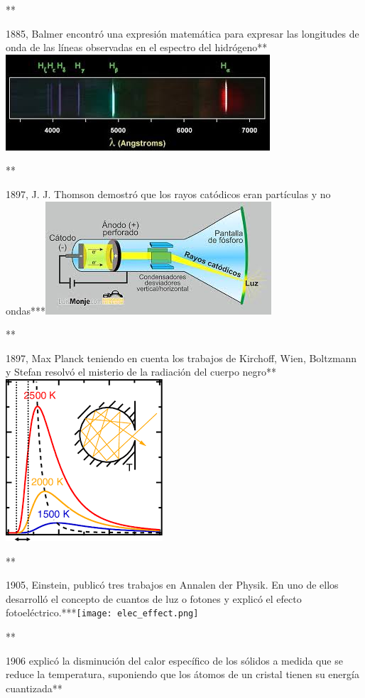 \documentclass[11pt]{article}
\begin{document}
**

1885, Balmer encontró una expresión matemática para expresar las
longitudes de onda de las líneas observadas en el espectro del
hidrógeno**\includegraphics{lineas_Balmer.jpeg}

**

1897, J. J. Thomson demostró que los rayos catódicos eran partículas y
no ondas***\includegraphics{ray_cathode.jpeg}

**

1897, Max Planck teniendo en cuenta los trabajos de Kirchoff, Wien,
Boltzmann y Stefan resolvó el misterio de la radiación del cuerpo
negro**\includegraphics{black_body.png}

**

1905, Einstein, publicó tres trabajos en Annalen der Physik. En uno de
ellos desarrolló el concepto de cuantos de luz o fotones y explicó el
efecto fotoeléctrico.***\texttt{[image: elec\_effect.png]}

**

1906 explicó la disminución del calor específico de los sólidos a medida
que se reduce la temperatura, suponiendo que los átomos de un cristal
tienen su energía cuantizada**
\end{document}
